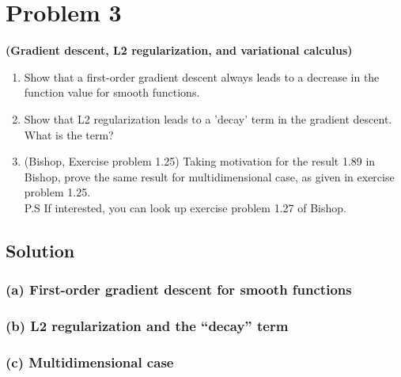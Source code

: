 \section*{Problem 3}

\textbf{(Gradient descent, L2 regularization, and variational calculus)}\\
\begin{enumerate}[label= (\alph*), noitemsep, topsep=0pt]
    \item Show that a first-order gradient descent always leads to a decrease in the function value for smooth functions.

    \item Show that L2 regularization leads to a 'decay' term in the gradient descent. What is the term?

    \item (Bishop, Exercise problem 1.25) Taking motivation for the result 1.89 in Bishop, prove the same result for multidimensional case, as given in exercise problem 1.25.\\
          P.S If interested, you can look up exercise problem 1.27 of Bishop.
\end{enumerate}

\subsection*{Solution}

\subsubsection*{(a) First-order gradient descent for smooth functions}

\subsubsection*{(b) L2 regularization and the ``decay'' term}

\subsubsection*{(c) Multidimensional case}
